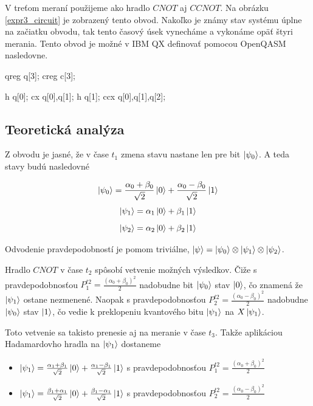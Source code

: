 V treťom meraní použijeme ako hradlo \(CNOT\) aj \(CCNOT\). Na obrázku 
\ref{expr3_circuit} je zobrazený tento obvod. Nakoľko je známy stav systému
úplne na začiatku obvodu, tak tento časový úsek vynecháme a vykonáme opäť
štyri merania. Tento obvod je možné v IBM QX definovať pomocou OpenQASM 
nasledovne.
\begin{code}
qreg q[3];
creg c[3];

h q[0];
cx q[0],q[1];
h q[1];
ccx q[0],q[1],q[2];
\end{code}


\subsection*{Teoretická analýza}
Z obvodu je jasné, že v čase \(t_1\) zmena stavu nastane len pre bit 
\(\ket{\psi_0}\). A teda stavy budú nasledovné

\[\ket{\psi_0} = \frac{\alpha_0 + \beta_0}{\sqrt{2}}\ket{0} + \frac{\alpha_0 - \beta_0}{\sqrt{2}}\ket{1}\]
\[\ket{\psi_1} = \alpha_1\ket{0} + \beta_1\ket{1}\]
\[\ket{\psi_2} = \alpha_2\ket{0} + \beta_2\ket{1}\]

Odvodenie pravdepodobností je pomom triviálne, 
\(\ket{\psi} = \ket{\psi_0} \otimes \ket{\psi_1} \otimes \ket{\psi_2}\).

Hradlo \(CNOT\) v čase \(t_2\) spôsobí vetvenie možných výsledkov. Čiže s 
pravdepodobnosťou \(P^{t2}_1 = \frac{(\alpha_0 + \beta_0)^2}{2}\) nadobudne
bit \(\ket{\psi_0}\) stav \(\ket{0}\), čo znamená že \(\ket{\psi_1}\) ostane
nezmenené. Naopak s pravdepodobnosťou 
\(P^{t2}_2 = \frac{(\alpha_0 - \beta_0)^2}{2}\) nadobudne \(\ket{\psi_0}\) 
stav \(\ket{1}\), čo vedie k preklopeniu kvantového bitu \(\ket{\psi_1}\) na
\(X\ket{\psi_1}\).

Toto vetvenie sa takisto prenesie aj na meranie v čase \(t_3\). Takže 
aplikáciou Hadamardovho hradla na \(\ket{\psi_1}\) dostaneme
\begin{itemize}
    \item[] \(\ket{\psi_1} = \frac{\alpha_1 + \beta_1}{\sqrt{2}}\ket{0} + \frac{\alpha_1 - \beta_1}{\sqrt{2}}\ket{1}\) s pravdepodobnosťou  \(P^{t2}_1 = \frac{(\alpha_0 + \beta_0)^2}{2}\)

    \item[] \(\ket{\psi_1} = \frac{\beta_1 + \alpha_1}{\sqrt{2}}\ket{0} + \frac{\beta_1 - \alpha_1}{\sqrt{2}}\ket{1}\) s pravdepodobnosťou  \(P^{t2}_2 = \frac{(\alpha_0 - \beta_0)^2}{2}\)
\end{itemize} 

